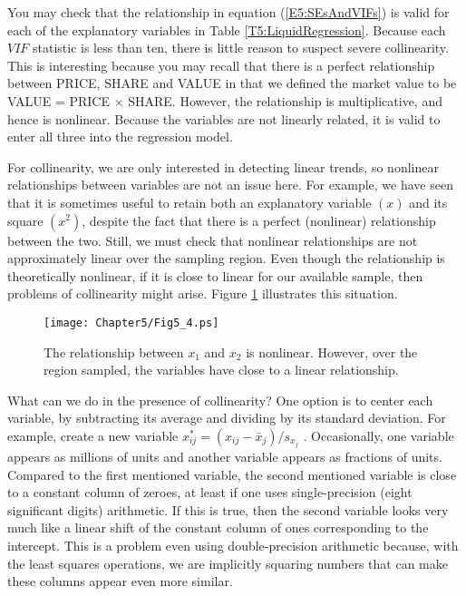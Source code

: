 You may check that the relationship in equation
(\ref{E5:SEsAndVIFs}) is valid for each of the explanatory variables
in Table \ref{T5:LiquidRegression}. Because each $VIF$ statistic is
less than ten, there is little reason to suspect severe
collinearity. This is interesting because you may recall that there
is a perfect relationship between PRICE, SHARE and VALUE in that we
defined the market value to be VALUE = PRICE $\times $ SHARE.
However, the relationship is multiplicative, and hence is nonlinear.
Because the variables are not linearly related, it is valid to enter
all three into the regression model.

\linejed

For collinearity, we are only interested in detecting linear trends,
so nonlinear relationships between variables are not an issue here.
For example, we have seen that it is sometimes useful to retain both
an explanatory variable $(x)$ and its square $(x^{2})$, despite the
fact that there is a perfect (nonlinear) relationship between the
two. Still, we must check that nonlinear relationships are not
approximately linear over the sampling region. Even though the
relationship is theoretically nonlinear, if it is close to linear
for our available sample, then problems of collinearity might arise.
Figure \ref{F5:Nearlinear} illustrates this situation.


\begin{figure}[htp]
  \begin{center}
    \texttt{[image: Chapter5/Fig5\_4.ps]}
    \caption{\label{F5:Nearlinear} \small  The relationship
between $x_{1}$ and $x_{2}$ is nonlinear. However, over the region
sampled, the variables have close to a linear relationship.}
  \end{center}
\end{figure}



What can we do in the presence of collinearity? One option is to center each
variable, by subtracting its average and dividing by its standard deviation.
For example, create a new variable $x_{ij}^{\ast }=(x_{ij}-\bar{x}%
_{j})/s_{x_{j}}$ . Occasionally, one variable appears as millions of units
and another variable appears as fractions of units. Compared to the first
mentioned variable, the second mentioned variable is close to a constant
column of zeroes, at least if one uses single-precision (eight significant
digits) arithmetic. If this is true, then the second variable looks very
much like a linear shift of the constant column of ones corresponding to the
intercept. This is a problem even using double-precision arithmetic because,
with the least squares operations, we are implicitly squaring numbers that
can make these columns appear even more similar.

